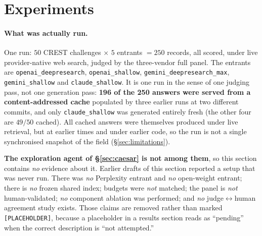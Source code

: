 \section{Experiments}
\label{sec:experiments}

\paragraph{What was actually run.} One run: $50$ CREST challenges $\times$ $5$ entrants $=250$
records, all scored, under live provider-native web search, judged by the three-vendor full panel.
The entrants are \texttt{openai\_deepresearch}, \texttt{openai\_shallow},
\texttt{gemini\_deepresearch\_max}, \texttt{gemini\_shallow} and \texttt{claude\_shallow}. It is one
run in the sense of one judging pass, not one generation pass: \textbf{196 of the 250 answers were
served from a content-addressed cache} populated by three earlier runs at two different commits, and
only \texttt{claude\_shallow} was generated entirely fresh (the other four are $49/50$ cached). All
cached answers were themselves produced under live retrieval, but at earlier times and under earlier
code, so the run is not a single synchronised snapshot of the field
(\S\ref{sec:limitations}).

\textbf{The exploration agent of \S\ref{sec:caesar} is not among them}, so this section contains
\emph{no} evidence about it. Earlier drafts of this section reported a setup that was never run.
There was \emph{no} Perplexity entrant and \emph{no} open-weight entrant; there is \emph{no} frozen
shared index; budgets were \emph{not} matched; the panel is \emph{not} human-validated; \emph{no}
component ablation was performed; and \emph{no} judge$\leftrightarrow$human agreement study exists.
Those claims are removed rather than marked \texttt{[PLACEHOLDER]}, because a
placeholder in a results section reads as ``pending'' when the correct description is ``not
attempted.''

